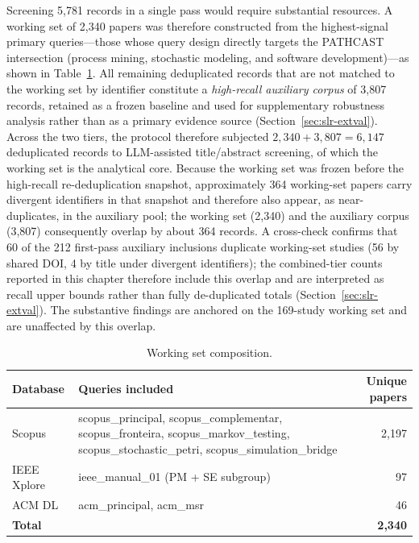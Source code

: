 Screening 5{,}781 records in a single pass would require substantial
resources. A working set of 2{,}340 papers was therefore constructed from the
highest-signal primary queries---those whose query design directly targets the
PATHCAST intersection (process mining, stochastic modeling, and software
development)---as shown in Table~\ref{tab:working-set}. All remaining
deduplicated records that are not matched to the working set by identifier
constitute a \textit{high-recall auxiliary corpus} of 3{,}807 records,
retained as a frozen baseline and used for supplementary robustness analysis
rather than as a primary evidence source (Section~\ref{sec:slr-extval}).
Across the two tiers, the protocol therefore subjected
$2{,}340 + 3{,}807 = 6{,}147$ deduplicated records to LLM-assisted
title/abstract screening, of which the working set is the analytical core.
Because the working set was frozen before the high-recall re-deduplication
snapshot, approximately 364 working-set papers carry divergent identifiers
in that snapshot and therefore also appear, as near-duplicates, in the
auxiliary pool; the working set (2{,}340) and the auxiliary corpus
(3{,}807) consequently overlap by about 364 records. A
cross-check confirms that 60 of the 212 first-pass auxiliary inclusions
duplicate working-set studies (56 by shared DOI, 4 by title under divergent
identifiers); the combined-tier
counts reported in this chapter therefore include this overlap and are
interpreted as recall upper bounds rather than fully de-duplicated totals
(Section~\ref{sec:slr-extval}). The substantive findings are anchored on the
169-study working set and are unaffected by this overlap.

\begin{table}[htbp]
\centering
\caption{Working set composition.}
\label{tab:working-set}
\small
\setlength{\tabcolsep}{4pt}
\begin{tabular}{p{2.2cm} p{8.3cm} r}
\toprule
\textbf{Database} & \textbf{Queries included} & \textbf{Unique papers} \\
\midrule
Scopus & scopus\_principal, scopus\_complementar, scopus\_fronteira,
         scopus\_markov\_testing, scopus\_stochastic\_petri,
         scopus\_simulation\_bridge & 2{,}197 \\
IEEE Xplore & ieee\_manual\_01 (PM + SE subgroup) & 97 \\
ACM DL & acm\_principal, acm\_msr & 46 \\
\midrule
\textbf{Total} & & \textbf{2{,}340} \\
\bottomrule
\end{tabular}
\end{table}

